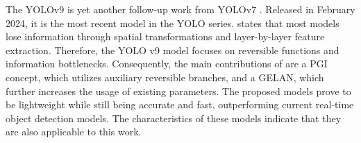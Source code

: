 The \ac{YOLO}v9 \cite{YOLOv9} is yet another follow-up work from \ac{YOLO}v7 \cite{yolov7}.
Released in February 2024, it is the most recent model in the \ac{YOLO} series.
\cite{YOLOv9} states that most models lose information through spatial transformations and layer-by-layer feature extraction.
Therefore, the YOLO v9 model focuses on reversible functions and information bottlenecks.
Consequently, the main contributions of \cite{YOLOv9} are a \ac{PGI} concept, which utilizes auxiliary reversible branches, and a \ac{GELAN}, which further increases the usage of existing parameters.
The proposed models prove to be lightweight while still being accurate and fast, outperforming current real-time object detection models.
The characteristics of these models indicate that they are also applicable to this work.
